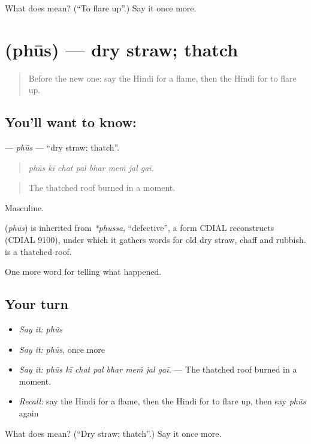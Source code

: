 \begin{tcolorbox}[breakable,colback=teal!4,colframe=teal!35!black,title={Before you move on}]
What does  mean? (\textquotedblleft{}To flare up\textquotedblright{}.) Say it once more.
\end{tcolorbox}
\section[\texorpdfstring{\hi{फूस} (phūs)}{फूस (phūs)}]{ (phūs) — dry straw; thatch}

\label{lesson:HI-C299-phus}



\begin{quote}
Before the new one: say the Hindi for a flame, then the Hindi for to flare up.
\end{quote}

\subsection*{You'll want to know: }
\textbf{} — \emph{phūs} — \textquotedblleft{}dry straw; thatch\textquotedblright{}.

\begin{quote}
       
\end{quote}

\begin{quote}
\emph{phūs kī chat pal bhar meṁ jal gaī.}
\end{quote}

\begin{quote}
The thatched roof burned in a moment.
\end{quote}

Masculine.

\begin{cousinweb}
\textbf{} (\emph{phūs}) is inherited from \emph{*phussa}, \textquotedblleft{}defective\textquotedblright{}, a form CDIAL reconstructs (CDIAL 9100), under which it gathers words for old dry straw, chaff and rubbish. \textbf{  } is a thatched roof.
\end{cousinweb}

\begin{grammarlens}[title={What you've built}]
One more word for telling what happened.
\end{grammarlens}

\subsection*{Your turn}
\begin{itemize}
\raggedright
  \item \emph{Say it:} \emph{phūs}
  \item \emph{Say it:} \emph{phūs}, once more
  \item \emph{Say it:} \emph{phūs kī chat pal bhar meṁ jal gaī.} — The thatched roof burned in a moment.
  \item \emph{Recall:} say the Hindi for a flame, then the Hindi for to flare up, then say \emph{phūs} again
\end{itemize}

\begin{tcolorbox}[breakable,colback=teal!4,colframe=teal!35!black,title={Before you move on}]
What does  mean? (\textquotedblleft{}Dry straw; thatch\textquotedblright{}.) Say it once more.
\end{tcolorbox}
